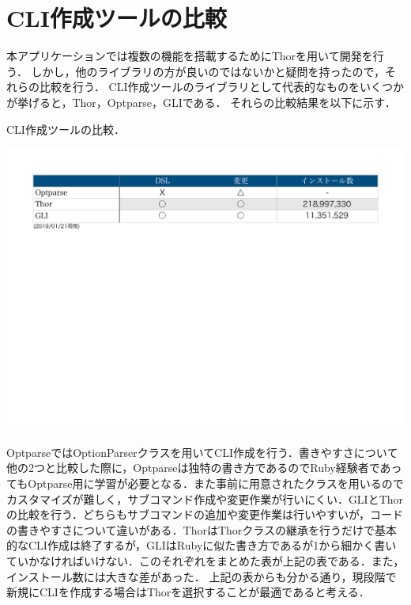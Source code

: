 \section{CLI作成ツールの比較}\label{command_line}
本アプリケーションでは複数の機能を搭載するためにThorを用いて開発を行う．
しかし，他のライブラリの方が良いのではないかと疑問を持ったので，それらの比較を行う．
CLI作成ツールのライブラリとして代表的なものをいくつかが挙げると，Thor，Optparse\cite{optparse}，GLI\cite{gli}である．
それらの比較結果を以下に示す．
\begin{table}[H]
\centering
\begin{center}
\caption{CLI作成ツールの比較．\label{cli_compare}}
\includegraphics[width=150mm]{../../picture/cli_compare.pdf}
\end{center}
\label{fig:}
\end{table}
OptparseではOptionParserクラスを用いてCLI作成を行う．書きやすさについて他の2つと比較した際に，Optparseは独特の書き方であるのでRuby経験者であってもOptparse用に学習が必要となる．また事前に用意されたクラスを用いるのでカスタマイズが難しく，サブコマンド作成や変更作業が行いにくい．GLIとThorの比較を行う．どちらもサブコマンドの追加や変更作業は行いやすいが，コードの書きやすさについて違いがある．ThorはThorクラスの継承を行うだけで基本的なCLI作成は終了するが，GLIはRubyに似た書き方であるが1から細かく書いていかなければいけない．このそれぞれをまとめた表が上記の表である．また，インストール数には大きな差があった．
上記の表からも分かる通り，現段階で新規にCLIを作成する場合はThorを選択することが最適であると考える．
